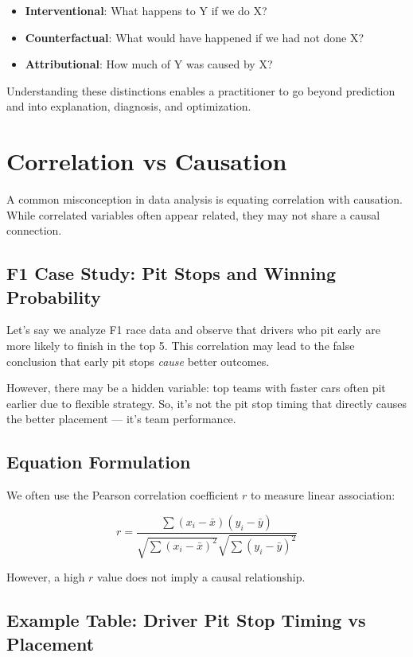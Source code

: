 \documentclass[12pt]{book}
\begin{document}
\begin{itemize}
    \item \textbf{Interventional}: What happens to Y if we do X?
    \item \textbf{Counterfactual}: What would have happened if we had not done X?
    \item \textbf{Attributional}: How much of Y was caused by X?
\end{itemize}

Understanding these distinctions enables a practitioner to go beyond prediction and into explanation, diagnosis, and optimization.

\section{Correlation vs Causation}

A common misconception in data analysis is equating correlation with causation. While correlated variables often appear related, they may not share a causal connection.

\subsection*{F1 Case Study: Pit Stops and Winning Probability}

Let's say we analyze F1 race data and observe that drivers who pit early are more likely to finish in the top 5. This correlation may lead to the false conclusion that early pit stops \textit{cause} better outcomes.

However, there may be a hidden variable: top teams with faster cars often pit earlier due to flexible strategy. So, it's not the pit stop timing that directly causes the better placement — it's team performance.



\subsection*{Equation Formulation}

We often use the Pearson correlation coefficient \( r \) to measure linear association:

\[
r = \frac{\sum (x_i - \bar{x})(y_i - \bar{y})}{\sqrt{\sum (x_i - \bar{x})^2} \sqrt{\sum (y_i - \bar{y})^2}}
\]

However, a high \( r \) value does not imply a causal relationship.

\subsection*{Example Table: Driver Pit Stop Timing vs Placement}
\end{document}
